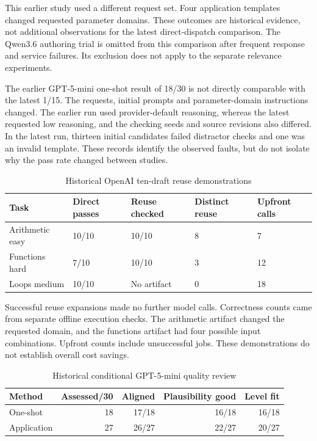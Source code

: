 This earlier study used a different request set. Four application templates changed requested parameter domains. These outcomes are historical evidence, not additional observations for the latest direct-dispatch comparison. The Qwen3.6 authoring trial is omitted from this comparison after frequent response and service failures. Its exclusion does not apply to the separate relevance experiments.

The earlier GPT-5-mini one-shot result of 18/30 is not directly comparable with the latest 1/15. The requests, initial prompts and parameter-domain instructions changed. The earlier run used provider-default reasoning, whereas the latest requested low reasoning, and the checking seeds and source revisions also differed. In the latest run, thirteen initial candidates failed distractor checks and one was an invalid template. These records identify the observed faults, but do not isolate why the pass rate changed between studies.

\begin{table}[!htbp]
\centering{}\small
\setlength{\tabcolsep}{5pt}\renewcommand{\arraystretch}{1.15}
\caption{Historical OpenAI ten-draft reuse demonstrations}\label{tab:reuse}
\begin{tabularx}{\linewidth}{@{}X P{.13\linewidth}P{.16\linewidth}P{.15\linewidth}P{.14\linewidth}@{}}
\toprule
\textbf{Task} & \textbf{Direct passes} & \textbf{Reuse checked} & \textbf{Distinct reuse} & \textbf{Upfront calls}\\
\midrule
Arithmetic easy & 10/10 & 10/10 & 8 & 7\\
Functions hard & 7/10 & 10/10 & 3 & 12\\
Loops medium & 10/10 & No artifact & 0 & 18\\
\bottomrule
\end{tabularx}
\end{table}

Successful reuse expansions made no further model calls. Correctness counts came from separate offline execution checks. The arithmetic artifact changed the requested domain, and the functions artifact had four possible input combinations. Upfront counts include unsuccessful jobs. These demonstrations do not establish overall cost savings.

\begin{table}[!htbp]
\centering{}\small
\setlength{\tabcolsep}{5pt}\renewcommand{\arraystretch}{1.15}
\caption{Historical conditional GPT-5-mini quality review}\label{tab:quality}
\begin{tabularx}{\linewidth}{@{}X r r r r@{}}
\toprule
\textbf{Method} & \textbf{Assessed/30} & \textbf{Aligned} & \textbf{Plausibility good} & \textbf{Level fit}\\
\midrule
One-shot & 18 & 17/18 & 16/18 & 16/18\\
Application & 27 & 26/27 & 22/27 & 20/27\\
\bottomrule
\end{tabularx}
\end{table}

